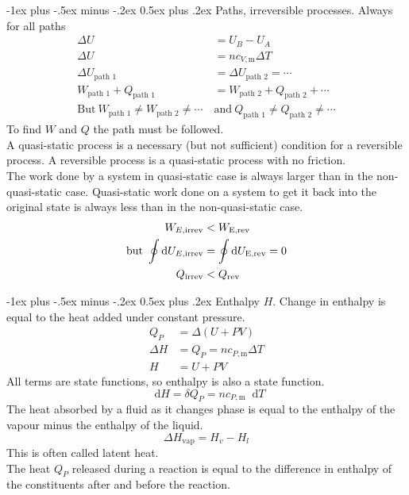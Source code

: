 \documentclass[10pt,landscape,a4paper]{article}
\makeatletter
\renewcommand\d{\mathop{}\!\mathrm{d}}
\renewcommand{\section}{\@startsection{section}{1}{0mm}%
	{-1ex plus -.5ex minus -.2ex}%
	{0.5ex plus .2ex}%
	{\normalfont\large\bfseries}}
\makeatother
\begin{document}
\begin{multicols}{3}
		\section{Paths, irreversible processes.}
		Always for all paths
			\begin{align*}
				\Delta U&=U_B-U_A\\
				\Delta U&=nc_{V,\text{m}}\Delta T\\
				\Delta U_\text{path 1}&=\Delta U_\text{path 2}=\cdots\\
				W_\text{path 1}+Q_\text{path 1}&=W_\text{path 2}+Q_\text{path 2}+\cdots\\
				\text{But} \ W_\text{path 1} \neq W_\text{path 2} \neq\cdots \ &\text{and} \ Q_\text{path 1} \neq Q_\text{path 2} \neq\cdots
			\end{align*}
		To find $ W $ and $ Q $ the path must be followed.\\
		A quasi-static process is a necessary (but not sufficient) condition for a reversible process.
		A reversible process is a quasi-static process with no friction.\\
		The work done by a system in quasi-static case is always larger than in the non-quasi-static case.
		Quasi-static work done on a system to get it back into the original state is always less than in the non-quasi-static case.
			\begin{align*}
				W_{E,\text{irrev}}&<W_\text{E,\text{rev}}\\
				\text{but} \ \oint{\d U_{E,\text{irrev}}}&=\oint{\d U_\text{E,\text{rev}}}=0\\
				Q_\text{irrev}&<Q_\text{rev}
			\end{align*}
		
		\section{Enthalpy $ H $.}
		Change in enthalpy is equal to the heat added under constant pressure.
			\begin{align*}
				Q_P&=\Delta(U+PV)\\
				\Delta H&=Q_P=nc_{P,\text{m}}\Delta T\\
				H&=U+PV
			\end{align*}
		All terms are state functions, so enthalpy is also a state function.
		\[
			\d H=\delta Q_P=nc_{P,\text{m}}\d T
		\]
		The heat absorbed by a fluid as it changes phase is equal to the enthalpy of the vapour minus the enthalpy of the liquid.
		\[
			\Delta H_\text{vap}=H_v-H_l
		\]
		This is often called latent heat.\\
		The heat $ Q_P $ released during a reaction is equal to the difference in enthalpy of the constituents after and before the reaction.
		

\end{multicols}
\end{document}
